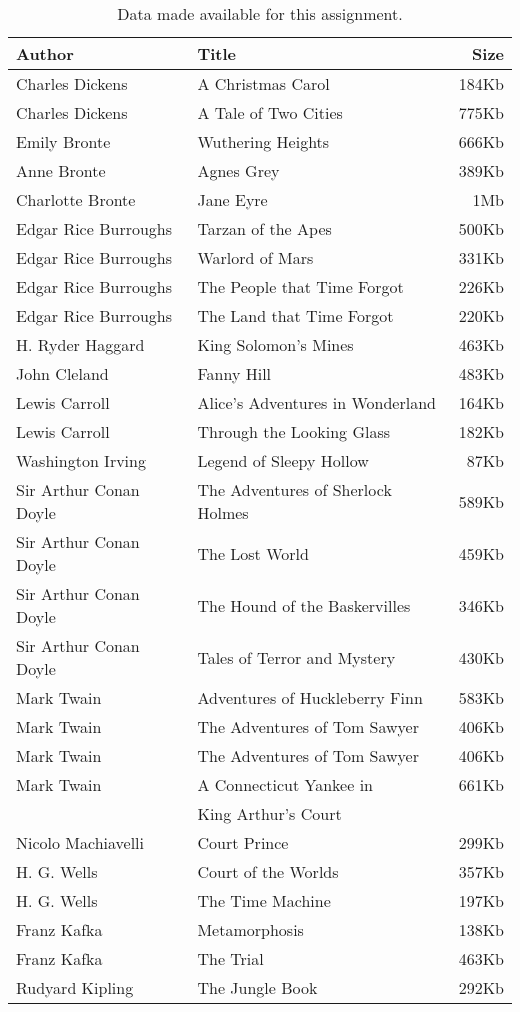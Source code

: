 \documentclass[conference]{IEEEtran}
\begin{document}
\begin{table}
\caption{Data made available for this assignment.\label{tab:books}}
\vspace{-18pt}
\begin{center}
\begin{tabular}{llr}
\hline
Author & Title & Size\hspace{0.9em} \\
\hline
Charles Dickens & A Christmas Carol & 184Kb \\
Charles Dickens & A Tale of Two Cities & 775Kb \\
Emily Bronte & Wuthering Heights & 666Kb \\
Anne Bronte & Agnes Grey & 389Kb \\
Charlotte Bronte & Jane Eyre & 1Mb \\
Edgar Rice Burroughs & Tarzan of the Apes & 500Kb \\
Edgar Rice Burroughs & Warlord of Mars & 331Kb \\
Edgar Rice Burroughs & The People that Time Forgot & 226Kb \\
Edgar Rice Burroughs & The Land that Time Forgot & 220Kb \\
H. Ryder Haggard & King Solomon's Mines & 463Kb \\
John Cleland & Fanny Hill & 483Kb \\
Lewis Carroll & Alice's Adventures in Wonderland & 164Kb \\
Lewis Carroll & Through the Looking Glass & 182Kb \\
Washington Irving & Legend of Sleepy Hollow & 87Kb \\
Sir Arthur Conan Doyle & The Adventures of Sherlock Holmes & 589Kb \\
Sir Arthur Conan Doyle & The Lost World & 459Kb \\
Sir Arthur Conan Doyle & The Hound of the Baskervilles & 346Kb \\
Sir Arthur Conan Doyle & Tales of Terror and Mystery & 430Kb \\
Mark Twain & Adventures of Huckleberry Finn & 583Kb \\
Mark Twain & The Adventures of Tom Sawyer & 406Kb \\
Mark Twain & The Adventures of Tom Sawyer & 406Kb \\
Mark Twain & A Connecticut Yankee in & 661Kb \\
           & King Arthur's Court & \\
Nicolo Machiavelli & Court Prince & 299Kb \\
H. G. Wells & Court of the Worlds & 357Kb \\
H. G. Wells & The Time Machine & 197Kb \\
Franz Kafka & Metamorphosis & 138Kb \\
Franz Kafka & The Trial & 463Kb \\
Rudyard Kipling & The Jungle Book & 292Kb \\
\hline
\end{tabular}
\end{center}
\end{table}
\end{document}
